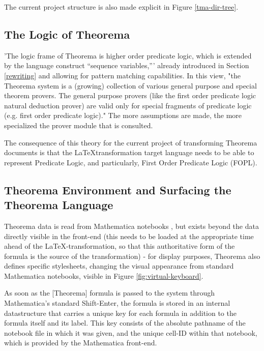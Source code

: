 The current project structure is also made explicit in Figure \ref{tma-dir-tree}.

\subsection{The Logic of Theorema}

'The logic frame of Theorema is higher order
predicate logic, which is extended by the language construct “sequence variables,”' \cite[p. 110]{g_mayrhofer_s_saminger__w_winsteiger_theorema_nodate} already introduced in Section \ref{rewriting} and allowing for pattern matching capabilities. In this view, "the Theorema system is a (growing) collection of various general purpose and special theorem provers. The general purpose provers (like the first order predicate logic natural deduction prover) are valid only for special fragments of predicate logic (e.g. first order predicate logic)." \cite[p. 110]{g_mayrhofer_s_saminger__w_winsteiger_theorema_nodate} The more assumptions are made, the more specialized the prover module that is consulted.

The consequence of this theory for the current project of transforming Theorema documents is that the \LaTeX transformation target language needs to be able to represent Predicate Logic, and particularly, First Order Predicate Logic (FOPL).

\subsection{Theorema Environment and Surfacing the Theorema Language}

Theorema data is read from Mathematica notebooks \cite[p. 75]{windsteiger_theorema_2013}, but exists beyond the data directly visible in the front-end (this needs to be loaded at the appropriate time ahead of the \LaTeX-transformation, so that this authoritative form of the formula is the source of the transformation) - for display purposes, Theorema also defines specific stylesheets, changing the visual appearance from standard Mathematica notebooks, visible in Figure \ref{fig:virtual-keyboard}.

\begin{displayquote}
As soon as the [Theorema] formula is passed to the system through Mathematica’s standard Shift-Enter, the formula is stored in an internal datastructure that carries a unique key for each formula in addition to the formula itself and its label. This key consists of the absolute pathname of the notebook file in which it was given, and the unique cell-ID within that notebook, which is provided by the Mathematica front-end.
\cite[p. 75]{windsteiger_theorema_2013}
\end{displayquote}

